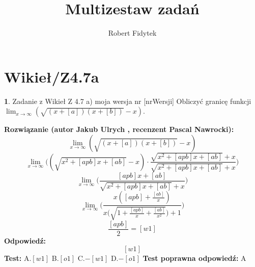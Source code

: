 \documentclass[12pt, a4paper]{article}
\title{Multizestaw zadań}
\author{Robert Fidytek}
\date{}
\theoremstyle{definition} %
\newtheorem{zad}{}
\newcommand{\kategoria}[1]{\section{#1}} %
\newcommand{\zadStart}[1]{\begin{zad}#1\newline} %
\newcommand{\zadStop}{\end{zad}}   %
\newcommand{\rozwStart}[2]{\noindent \textbf{Rozwiązanie (autor #1 , recenzent #2): }\newline} %
\newcommand{\rozwStop}{\newline}                                            %
\newcommand{\odpStart}{\noindent \textbf{Odpowiedź:}\newline}    %
\newcommand{\odpStop}{\newline}                                             %
\newcommand{\testStart}{\noindent \textbf{Test:}\newline} %
\newcommand{\testStop}{\newline} %
\newcommand{\kluczStart}{\noindent \textbf{Test poprawna odpowiedź:}\newline} %
\newcommand{\kluczStop}{\newline} %
\begin{document}
\maketitle


\kategoria{Wikieł/Z4.7a}
\zadStart{Zadanie z Wikieł Z 4.7 a) moja wersja nr [nrWersji]}
Obliczyć granicę funkcji $\lim_{x \to \infty}(\sqrt{(x+[a])(x+[b])}-x)$.
\zadStop
\rozwStart{Jakub Ulrych}{Pascal Nawrocki}
$$\lim_{x \to \infty}(\sqrt{(x+[a])(x+[b])}-x)$$
$$\lim_{x \to \infty}\bigg((\sqrt{x^{2}+[apb]x+[ab]}-x)\cdot \frac{\sqrt{x^{2}+[apb]x+[ab]}+x}{\sqrt{x^{2}+[apb]x+[ab]}+x}\bigg)$$
$$\lim_{x \to \infty}\bigg(\frac{[apb]x+[ab]}{\sqrt{x^{2}+[apb]x+[ab]}+x}\bigg)$$
$$\lim_{x \to \infty}\bigg(\frac{x([apb]+\frac{[ab]}{x})}{x\big(\sqrt{1+\frac{[apb]}{x}+\frac{[ab]}{x^{2}}}\big)+1}\bigg)$$
$$\frac{[apb]}{2}=[w1]$$
\rozwStop
\odpStart
$$[w1]$$
\odpStop
\testStart
A.$[w1]$
B.$[o1]$
C.$-[w1]$
D.$-[o1]$
\testStop
\kluczStart
A
\kluczStop
\end{document}

